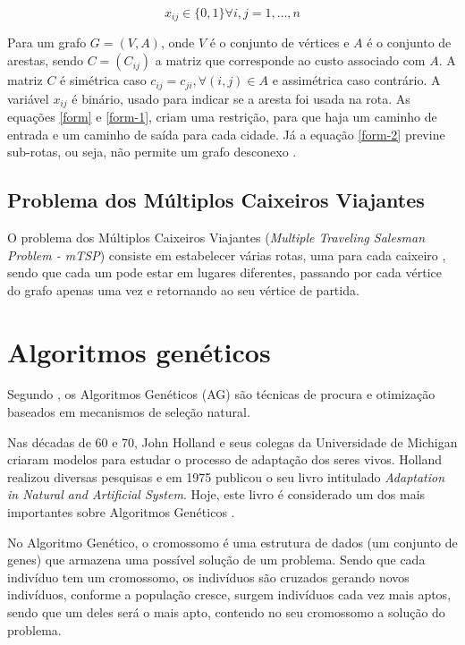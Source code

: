 \documentclass{abnt}
\begin{document}
		\begin{equation}
		\label{form-3}
 		   	x_{ij} \in \{0,1\}\forall i,j=1,\dots,n
		\end{equation}
		
			
		Para um grafo  $G=(V,A)$, onde $V$ é o conjunto de vértices e $A$  é o conjunto de arestas, sendo $C = (C_{ij})$ a matriz que corresponde ao custo associado com $A$. A matriz $C$ é simétrica caso $c_{ij}=c_{ji},\forall(i,j) \in A$ e assimétrica caso contrário. A variável $x_{ij}$ é binário, usado para indicar se a aresta foi usada na rota. As equações \ref{form} e \ref{form-1}, criam uma restrição, para que haja um caminho de entrada e um caminho de saída para cada cidade. Já a equação \ref{form-2} previne sub-rotas, ou seja, não permite um grafo desconexo \cite{dissertation}.

		
	\section{Problema  dos Múltiplos Caixeiros Viajantes }

	O problema dos Múltiplos Caixeiros Viajantes (\textit{Multiple Traveling Salesman Problem - mTSP}) consiste em estabelecer várias rotas, uma para cada caixeiro
	, sendo que cada um pode estar em lugares diferentes, passando por cada vértice do grafo apenas uma vez e retornando ao seu vértice de partida. 
	
	\chapter{Algoritmos genéticos}

		Segundo , os Algoritmos Genéticos (AG) são técnicas de procura e otimização baseados em mecanismos de seleção natural. 

		Nas décadas de 60 e 70, John Holland e seus colegas da Universidade de Michigan criaram modelos para estudar o processo de adaptação dos seres vivos. Holland realizou diversas pesquisas e em 1975 publicou o seu livro intitulado \textit{Adaptation in Natural and Artificial System}. Hoje, este livro é considerado um dos mais importantes sobre Algoritmos Genéticos \cite{0001-pdf}.

		No Algoritmo Genético, o cromossomo é uma estrutura de dados (um conjunto de genes) que armazena uma possível solução de um problema. Sendo que cada indivíduo tem um cromossomo, os indivíduos são cruzados gerando novos indivíduos, conforme a população cresce, surgem indivíduos cada vez mais aptos, sendo que um deles será o mais apto, contendo no seu cromossomo a solução do problema.
\end{document}
